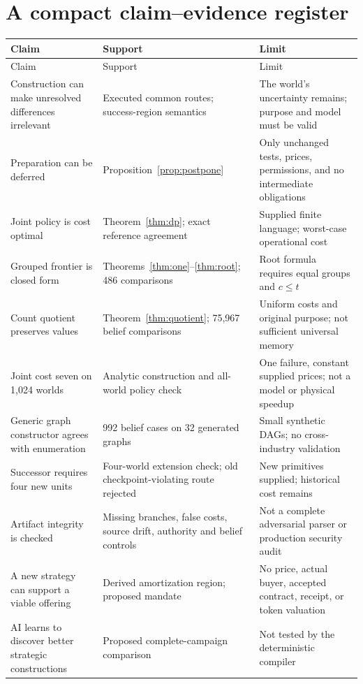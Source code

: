 \documentclass[11pt,letterpaper]{article}
\theoremstyle{remark}\newtheorem{remark}{Remark}[section]
\begin{document}
\section{A compact claim--evidence register}
\label{app:claims}
\small
\begin{longtable}{@{}P{.28\linewidth}P{.32\linewidth}P{.33\linewidth}@{}}\toprule
Claim & Support & Limit\\\midrule\endfirsthead
\toprule Claim & Support & Limit\\\midrule\endhead
Construction can make unresolved differences irrelevant & Executed common routes; success-region semantics & The world's uncertainty remains; purpose and model must be valid\\
Preparation can be deferred & Proposition~\ref{prop:postpone} & Only unchanged tests, prices, permissions, and no intermediate obligations\\
Joint policy is cost optimal & Theorem~\ref{thm:dp}; exact reference agreement & Supplied finite language; worst-case operational cost\\
Grouped frontier is closed form & Theorems~\ref{thm:one}--\ref{thm:root}; 486 comparisons & Root formula requires equal groups and $c\le t$\\
Count quotient preserves values & Theorem~\ref{thm:quotient}; 75,967 belief comparisons & Uniform costs and original purpose; not sufficient universal memory\\
Joint cost seven on 1,024 worlds & Analytic construction and all-world policy check & One failure, constant supplied prices; not a model or physical speedup\\
Generic graph constructor agrees with enumeration & 992 belief cases on 32 generated graphs & Small synthetic DAGs; no cross-industry validation\\
Successor requires four new units & Four-world extension check; old checkpoint-violating route rejected & New primitives supplied; historical cost remains\\
Artifact integrity is checked & Missing branches, false costs, source drift, authority and belief controls & Not a complete adversarial parser or production security audit\\
A new strategy can support a viable offering & Derived amortization region; proposed mandate & No price, actual buyer, accepted contract, receipt, or token valuation\\
AI learns to discover better strategic constructions & Proposed complete-campaign comparison & Not tested by the deterministic compiler\\\bottomrule
\end{longtable}
\normalsize
\end{document}
